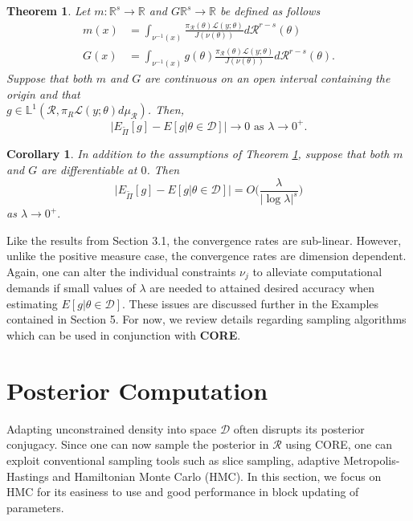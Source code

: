 \documentclass[10pt,fleqn]{article}
\newcommand{\core}{\textbf{CORE}}
\newtheorem{theorem}{Theorem}
\newtheorem{corollary}{Corollary}
\newcommand{\mc}[1]{\mathcal{#1}}
\DeclareMathOperator{\1}{\mathbbm{1}}
\begin{document}
\begin{theorem}
\label{THM:Relaxed_Expectation_Convergence_Measure_Zero}
Let $m:\mathbb{R}^s\to \mathbb{R}$ and $G\mathbb{R}^s\to \mathbb{R}$ be defined as follows
\begin{align*}
m(x) &= \int_{\nu^{-1}(x)} \frac{\pi_\mathcal{R}(\theta) \mathcal{L}(y;\theta)}{J(\nu(\theta))} d\mathcal{R}^{r-s}(\theta) \\
G(x) &= \int_{\nu^{-1}(x)} g(\theta)\frac{\pi_\mathcal{R}(\theta) \mathcal{L}(y;\theta)}{J(\nu(\theta))} d\mathcal{R}^{r-s}(\theta).
\end{align*}
Suppose that both $m$ and $G$ are continuous on an open interval containing the origin and that \\ $g\in\mathbb{L}^1(\mathcal{R},\pi_R\mathcal{L}(y;\theta)d\mu_\mathcal{R})$. Then,
$$\bigg|E_{\tilde{\Pi}}[g] - E[g|\theta \in \mathcal{D}]\bigg| \to 0 \text{ as } \lambda\to 0^+.$$
\end{theorem}

\begin{corollary}
In addition to the assumptions of Theorem \ref{THM:Relaxed_Expectation_Convergence_Measure_Zero}, suppose that both $m$ and $G$ are differentiable at $0$. Then
$$\bigg|E_{\tilde{\Pi}}[g] - E[g|\theta \in \mathcal{D}] \bigg| = O\bigg(\frac{\lambda}{|\log \lambda|^s}\bigg)$$
as $\lambda \to 0^+.$
\end{corollary}

Like the results from Section 3.1, the convergence rates are sub-linear.  However, unlike the positive measure case, the convergence rates are dimension dependent.  Again, one can alter the individual constraints $\nu_j$ to alleviate computational demands if small values of $\lambda$ are needed to attained desired accuracy when estimating $E[g|\theta\in\mathcal{D}].$ These issues are discussed further in the Examples contained in Section 5. For now, we review details regarding sampling algorithms which can be used in conjunction with \core.


 
\section{Posterior Computation}

Adapting  unconstrained density into space $\mc D$ often disrupts its posterior conjugacy. Since one can now sample the posterior in $\mc R$ using
 CORE, one can exploit conventional sampling tools such as slice sampling, adaptive Metropolis-Hastings and Hamiltonian Monte Carlo (HMC). In this section, we focus on HMC for its easiness to use and good performance in block updating of parameters.
\end{document}
